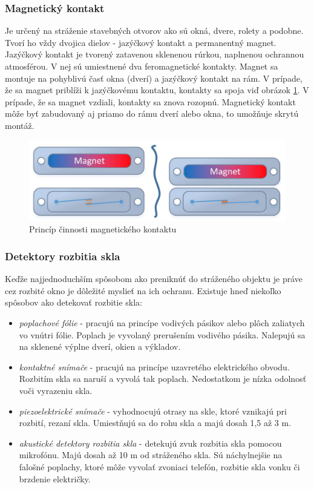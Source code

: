 \subsubsection{Magnetický kontakt}

Je určený na stráženie stavebných otvorov ako sú okná, dvere, rolety a podobne. Tvorí ho vždy dvojica dielov - jazýčkový kontakt a permanentný magnet. Jazýčkový kontakt je tvorený zatavenou sklenenou rúrkou, naplnenou ochrannou atmosférou. V nej sú umiestnené dva feromagnetické kontakty. Magnet sa montuje na pohyblivú časť okna (dverí) a jazýčkový kontakt na rám. V prípade, že sa magnet priblíži k jazýčkovému kontaktu, kontakty sa spoja viď obrázok \ref{fig:magnetickykontakt}. V prípade, že sa magnet vzdiali, kontakty sa znova rozopnú. Magnetický kontakt môže byť zabudovaný aj priamo do rámu dverí alebo okna, to umožňuje skrytú montáž.\cite{velas_ezs}

\begin{figure}[hbt]
    \centering
    \includegraphics[width=\linewidth]{obrazky-figures/magnetickykontakt.png}
    \caption[Princíp činnosti magnetického kontaktu]{Princíp činnosti magnetického kontaktu\cite{magnetickykontakt}}
    \label{fig:magnetickykontakt}
\end{figure}

\subsubsection{Detektory rozbitia skla}

Keďže najjednoduchším spôsobom ako preniknúť do stráženého objektu je práve cez rozbité okno je dôležité myslieť na ich ochranu. Existuje hneď niekoľko spôsobov ako detekovať rozbitie skla:
\begin{itemize}
    \item \textit{poplachové fólie} - pracujú na princípe vodivých pásikov alebo plôch zaliatych vo vnútri fólie. Poplach je vyvolaný prerušením vodivého pásika. Nalepujú sa na sklenené výplne dverí, okien a výkladov.
    \item \textit{kontaktné snímače} - pracujú na princípe uzavretého elektrického obvodu. Rozbitím skla sa naruší a vyvolá tak poplach. Nedostatkom je nízka odolnosť voči vyrazeniu skla.
    \item \textit{piezoelektrické snímače} - vyhodnocujú otrasy na skle, ktoré vznikajú pri rozbití, rezaní skla. Umiestňujú sa do rohu skla a majú dosah 1,5 až 3 m.
    \item \textit{akustické detektory rozbitia skla} - detekujú zvuk rozbitia skla pomocou mikrofónu. Majú dosah až 10 m od stráženého skla. Sú náchylnejšie na falošné poplachy, ktoré môže vyvolať zvoniaci telefón, rozbitie skla vonku či brzdenie električky.
\end{itemize}

